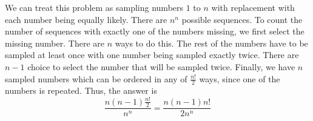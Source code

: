 We can treat this problem as sampling numbers $1$ to $n$ with replacement 
with each number being equally likely. There are $n^{n}$ possible sequences. 
To count the number of sequences with exactly one of the numbers missing, 
we first select the missing number. There are $n$ ways to do this. The rest of 
the numbers have to be sampled at least once with one number being sampled 
exactly twice. There are $n-1$ choice to select the number that will 
be sampled twice. Finally, we have $n$ sampled numbers which can be ordered in 
any of $\frac{n!}{2}$ ways, since one of the numbers is repeated. 
Thus, the answer is
$$\frac{n(n-1)\frac{n!}{2}}{n^{n}} = \frac{n(n-1)n!}{2n^{n}}$$